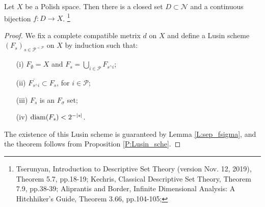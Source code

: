 \begin{theorem} \label{T:pol_bij}
Let $X$ be a Polish space. Then there is a closed set $D\subset \mathcal{N}$ and a
continuous bijection $f: D\to X$.
\footnote{
  Tserunyan, Introduction to Descriptive Set Theory (version Nov. 12, 2019), 
  Theorem 5.7, pp.18-19;
  Kechris, Classical Descriptive Set Theory, Theorem 7.9, pp.38-39;
  Aliprantis and Border, Infinite Dimensional Analysis: A 
  Hitchhiker's Guide, Theorem 3.66, pp.104-105;
}
\end{theorem}
\begin{proof}
We fix a complete compatible metrix $d$ on $X$ and define a Lusin scheme 
$(F_s)_{s\in \mathcal{P}^{<\mathcal{P}}}$ on $X$ by induction such that:
\begin{enumerate}
   \item[(i)] $F_{\emptyset}=X$ and 
              $F_s=\bigcup_{i\in\mathcal{P}} F_{s^\wedge i}$;
   \item[(ii)] $\overline{F_{s^\wedge i}}\subset F_s$, for $i\in\mathcal{P}$;
   \item[(iii)] $F_s$ is an $F_{\sigma}$ set;
   \item[(iv)] $\operatorname*{diam}(F_s)<2^{-|s|}$.
\end{enumerate}
The existence of this Lusin scheme is guaranteed by Lemma \ref{L:sep_fsigma},
and the theorem follows from Proposition \ref{P:Lusin_sche}.

\end{proof}









